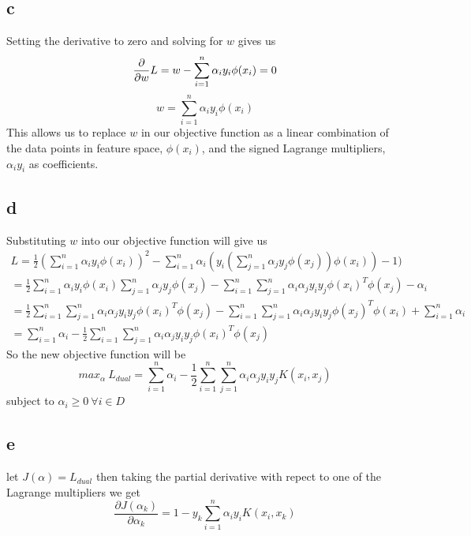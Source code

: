 \documentclass{article}
\begin{document}
\subsection{c}
Setting the derivative to zero and solving for $w$ gives us
\begin{equation*}
  \frac{\partial}{\partial w} L = w - \sum_{i=1}^{n}\alpha_i y_i \phi(x_i) = 0 \\
\end{equation*}
\begin{equation*}
w = \sum_{i=1}^{n}\alpha_i y_i \phi(x_i)
\end{equation*}
This allows us to replace $w$ in our objective function as a linear combination
of the data points in feature space, $\phi(x_i)$, and the signed Lagrange
multipliers, $\alpha_i y_i$ as coefficients. 

\subsection{d}
Substituting $w$ into our objective function will give us
\begin{multline*}
  L = \frac{1}{2}(\sum_{i=1}^{n}\alpha_i y_i \phi(x_i))^2 -
    \sum_{i=1}^{n}\alpha_i(y_i(\sum_{j=1}^{n}\alpha_j y_j \phi(x_j) )\phi(x_i)) - 1) \\
  = \frac{1}{2}\sum_{i=1}^{n}\alpha_i y_i \phi(x_i) \sum_{j=1}^{n}\alpha_j y_j \phi(x_j) -
    \sum_{i=1}^{n}\sum_{j=1}^{n}\alpha_i \alpha_j y_i y_j \phi(x_i)^T \phi(x_j) - \alpha_i \\
  = \frac{1}{2}\sum_{i=1}^{n}\sum_{j=1}^{n}\alpha_i \alpha_j y_i y_j \phi(x_i)^T \phi(x_j) -
    \sum_{i=1}^{n}\sum_{j=1}^{n}\alpha_i \alpha_j y_i y_j \phi(x_j)^T \phi(x_i) + \sum_{i=1}^{n}\alpha_i \\
  = \sum_{i=1}^{n}\alpha_i - \frac{1}{2}\sum_{i=1}^{n}\sum_{j=1}^{n}\alpha_i \alpha_j y_i y_j \phi(x_i)^T \phi(x_j)
\end{multline*}
So the new objective function will be
\begin{equation*}
  max_{\alpha}\ L_{dual} = \sum_{i=1}^{n}\alpha_i -
    \frac{1}{2}\sum_{i=1}^{n}\sum_{j=1}^{n}\alpha_i \alpha_j y_i y_j K(x_i, x_j)
\end{equation*}
subject to $\alpha_i \geq 0\ \forall i \in D$

\subsection{e}
let $J(\alpha)=L_{dual}$ then taking the partial derivative with repect to one
of the Lagrange multipliers we get
\begin{equation*}
  \frac{\partial J(\alpha_k)}{\partial \alpha_k} = 1 -
    y_k\sum_{i=1}^{n} \alpha_i y_i K(x_i, x_k)
\end{equation*}
\end{document}
